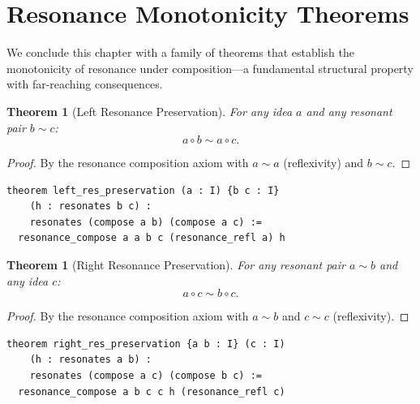 \documentclass[11pt,openany]{book}
\theoremstyle{definition}
\theoremstyle{plain}
\newtheorem{theorem}[axiom]{Theorem}
\theoremstyle{remark}
\newcommand{\compose}{\circ}                 %
\newcommand{\res}{\sim}                      %
\begin{document}
\section{Resonance Monotonicity Theorems}

We conclude this chapter with a family of theorems that establish the monotonicity of resonance under composition---a fundamental structural property with far-reaching consequences.

\begin{theorem}[Left Resonance Preservation]
\label{thm:left-res}
For any idea $a$ and any resonant pair $b \res c$:
\[
a \compose b \res a \compose c.
\]
\end{theorem}

\begin{proof}
By the resonance composition axiom with $a \res a$ (reflexivity) and $b \res c$.
\end{proof}

\begin{lstlisting}[language=Lean4]
theorem left_res_preservation (a : I) {b c : I}
    (h : resonates b c) :
    resonates (compose a b) (compose a c) :=
  resonance_compose a a b c (resonance_refl a) h
\end{lstlisting}

\begin{theorem}[Right Resonance Preservation]
\label{thm:right-res}
For any resonant pair $a \res b$ and any idea $c$:
\[
a \compose c \res b \compose c.
\]
\end{theorem}

\begin{proof}
By the resonance composition axiom with $a \res b$ and $c \res c$ (reflexivity).
\end{proof}

\begin{lstlisting}[language=Lean4]
theorem right_res_preservation {a b : I} (c : I)
    (h : resonates a b) :
    resonates (compose a c) (compose b c) :=
  resonance_compose a b c c h (resonance_refl c)
\end{lstlisting}
\end{document}
